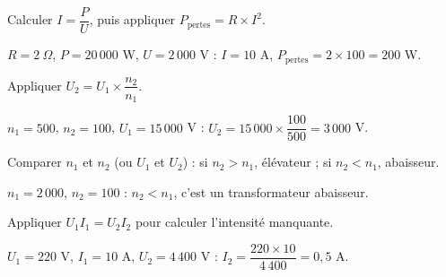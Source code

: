 Calculer $I=\dfrac PU$, puis appliquer $P_{\text{pertes}}=R\times I^2$.
\begin{exemple}
$R=2\ \Omega$, $P=20\,000$ W, $U=2\,000$ V : $I=10$ A, $P_{\text{pertes}}=2\times100=200$
W.
\end{exemple}

Appliquer $U_2=U_1\times\dfrac{n_2}{n_1}$.
\begin{exemple}
$n_1=500$, $n_2=100$, $U_1=15\,000$ V : $U_2=15\,000\times\dfrac{100}{500}=3\,000$ V.
\end{exemple}

Comparer $n_1$ et $n_2$ (ou $U_1$ et $U_2$) : si $n_2>n_1$, élévateur ; si $n_2<n_1$,
abaisseur.
\begin{exemple}
$n_1=2\,000$, $n_2=100$ : $n_2<n_1$, c'est un transformateur abaisseur.
\end{exemple}

Appliquer $U_1I_1=U_2I_2$ pour calculer l'intensité manquante.
\begin{exemple}
$U_1=220$ V, $I_1=10$ A, $U_2=4\,400$ V : $I_2=\dfrac{220\times10}{4\,400}=0{,}5$ A.
\end{exemple}

